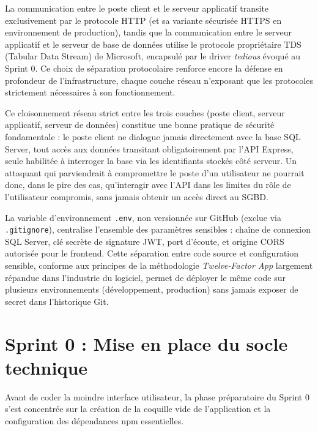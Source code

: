 La communication entre le poste client et le serveur applicatif transite exclusivement par le protocole HTTP (et sa variante sécurisée HTTPS en environnement de production), tandis que la communication entre le serveur applicatif et le serveur de base de données utilise le protocole propriétaire TDS (Tabular Data Stream) de Microsoft, encapsulé par le driver \textit{tedious} évoqué au Sprint 0. Ce choix de séparation protocolaire renforce encore la défense en profondeur de l'infrastructure, chaque couche réseau n'exposant que les protocoles strictement nécessaires à son fonctionnement.


Ce cloisonnement réseau strict entre les trois couches (poste client, serveur applicatif, serveur de données) constitue une bonne pratique de sécurité fondamentale : le poste client ne dialogue jamais directement avec la base SQL Server, tout accès aux données transitant obligatoirement par l'API Express, seule habilitée à interroger la base via les identifiants stockés côté serveur. Un attaquant qui parviendrait à compromettre le poste d'un utilisateur ne pourrait donc, dans le pire des cas, qu'interagir avec l'API dans les limites du rôle de l'utilisateur compromis, sans jamais obtenir un accès direct au SGBD.

La variable d'environnement \texttt{.env}, non versionnée sur GitHub (exclue via \texttt{.gitignore}), centralise l'ensemble des paramètres sensibles : chaîne de connexion SQL Server, clé secrète de signature JWT, port d'écoute, et origine CORS autorisée pour le frontend. Cette séparation entre code source et configuration sensible, conforme aux principes de la méthodologie \textit{Twelve-Factor App} largement répandue dans l'industrie du logiciel, permet de déployer le même code sur plusieurs environnements (développement, production) sans jamais exposer de secret dans l'historique Git.


\section{Sprint 0 : Mise en place du socle technique}
Avant de coder la moindre interface utilisateur, la phase préparatoire du Sprint 0 s'est concentrée sur la création de la coquille vide de l'application et la configuration des dépendances npm essentielles.

